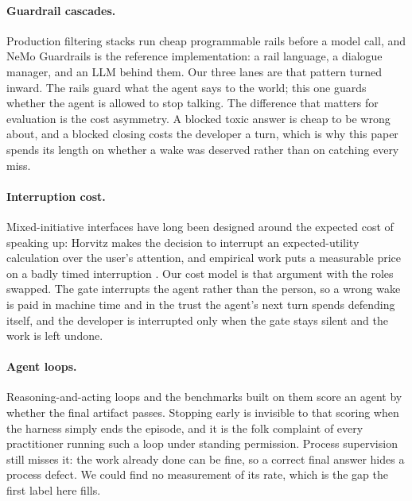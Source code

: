 \paragraph{Guardrail cascades.} Production filtering stacks run cheap
programmable rails before a model call, and NeMo Guardrails
\cite{rebedea2023nemo} is the reference implementation: a rail language, a
dialogue manager, and an LLM behind them. Our three lanes are that pattern
turned inward. The rails guard what the agent says to the world; this one
guards whether the agent is allowed to stop talking. The difference that
matters for evaluation is the cost asymmetry. A blocked toxic answer is
cheap to be wrong about, and a blocked closing costs the developer a turn,
which is why this paper spends its length on whether a wake was deserved
rather than on catching every miss.

\paragraph{Interruption cost.} Mixed-initiative interfaces have long been
designed around the expected cost of speaking up: Horvitz
\cite{horvitz1999mixed} makes the decision to interrupt an expected-utility
calculation over the user's attention, and empirical work puts a measurable
price on a badly timed interruption \cite{mark2008cost}. Our cost model is
that argument with the roles swapped. The gate interrupts the agent rather
than the person, so a wrong wake is paid in machine time and in the trust the
agent's next turn spends defending itself, and the developer is interrupted
only when the gate stays silent and the work is left undone.

\paragraph{Agent loops.} Reasoning-and-acting loops \cite{yao2023react} and
the benchmarks built on them \cite{jimenez2024swebench} score an agent by
whether the final artifact passes. Stopping early is invisible to that scoring
when the harness simply ends the episode, and it is the folk complaint of every
practitioner running such a loop under standing permission. Process
supervision \cite{lightman2023verify} still misses it: the work already done
can be fine, so a correct final answer hides a process defect. We could find
no measurement of its rate, which is the gap the first label here fills.

